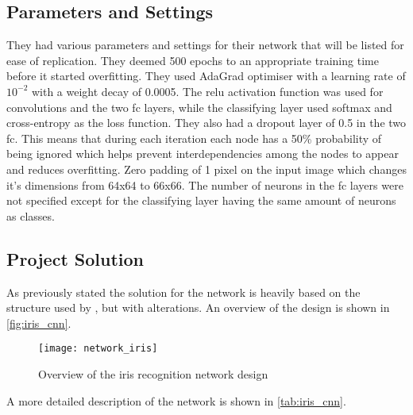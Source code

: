 \subsection{Parameters and Settings}
They had various parameters and settings for their network that will be listed for ease of replication. They deemed 500 epochs to an appropriate training time before it started overfitting. They used AdaGrad optimiser with a learning rate of $10^{-2}$ with a weight decay of 0.0005. The \gls{relu} activation function was used for convolutions and the two \gls{fc} layers, while the classifying layer used softmax and cross-entropy as the loss function. They also had a dropout layer of 0.5 in the two \gls{fc}. This means that during each iteration each node has a 50\% probability of being ignored which helps prevent interdependencies among the nodes to appear and reduces overfitting. Zero padding of 1 pixel on the input image which changes it's dimensions from 64x64 to 66x66. The number of neurons in the \gls{fc} layers were not specified except for the classifying layer having the same amount of neurons as classes. 

\subsection{Project Solution}
As previously stated the solution for the network is heavily based on the structure used by \cite{Al-Waisy2017}, but with alterations. An overview of the design is shown in \autoref{fig:iris_cnn}.

\begin{figure}[H]
	\centering
	\texttt{[image: network\_iris]}
	\caption{Overview of the iris recognition network design}
	\label{fig:iris_cnn}
\end{figure}

A more detailed description of the network is shown in \autoref{tab:iris_cnn}.

